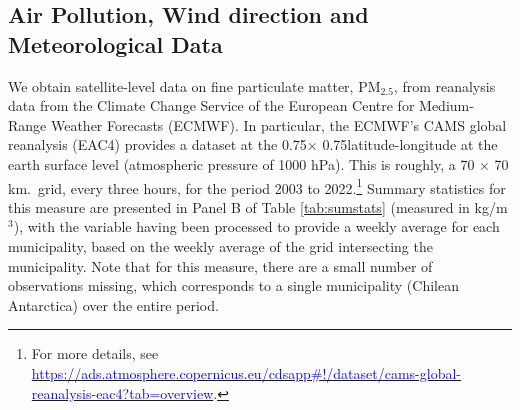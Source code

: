 \documentclass[11pt]{article}
\begin{document}
\begin{spacing}{1.3}
\subsection{Air Pollution, Wind direction and Meteorological Data}
\label{sscn:airdata}
We obtain satellite-level data on fine particulate matter, PM$_{2.5}$, from reanalysis data from the Climate Change Service of the European Centre for Medium-Range Weather Forecasts (ECMWF). In particular, the ECMWF's CAMS global reanalysis (EAC4) provides a dataset at the 0.75\textdegree $\times$ 0.75\textdegree latitude-longitude at the earth surface level (atmospheric pressure of 1000 hPa). This is roughly, a 70 $\times$ 70 km.\ grid, every three hours, for the period 2003 to 2022.\footnote{For more details, see \hyperlink{https://ads.atmosphere.copernicus.eu/cdsapp\#!/dataset/cams-global-reanalysis-eac4?tab=overview}{\textcolor{blue}{https://ads.atmosphere.copernicus.eu/cdsapp\#!/dataset/cams-global-reanalysis-eac4?tab=overview}}.}  Summary statistics for this measure are presented in Panel B of Table \ref{tab:sumstats} (measured in kg/m$^3$), with the variable having been processed to provide a weekly average for each municipality, based on the weekly average of the grid intersecting the municipality.  Note that for this measure, there are a small number of observations missing, which corresponds to a single municipality (Chilean Antarctica) over the entire period.



\end{spacing}
\end{document}

